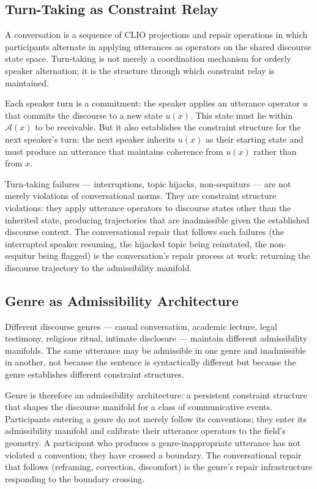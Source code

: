 \documentclass[11pt, a4paper]{article}
\theoremstyle{definition}
\theoremstyle{remark}
\begin{document}
\subsection{Turn-Taking as Constraint Relay}

A conversation is a sequence of CLIO projections and repair operations in
which participants alternate in applying utterances as operators on the shared
discourse state space. Turn-taking is not merely a coordination mechanism for
orderly speaker alternation; it is the structure through which constraint relay
is maintained.

Each speaker turn is a commitment: the speaker applies an utterance operator
$u$ that commits the discourse to a new state $u(x)$. This state must lie
within $\mathcal{A}(x)$ to be receivable. But it also establishes the
constraint structure for the next speaker's turn: the next speaker inherits
$u(x)$ as their starting state and must produce an utterance that maintains
coherence from $u(x)$ rather than from $x$.

Turn-taking failures --- interruptions, topic hijacks, non-sequiturs ---
are not merely violations of conversational norms. They are constraint
structure violations: they apply utterance operators to discourse states
other than the inherited state, producing trajectories that are inadmissible
given the established discourse context. The conversational repair that follows
such failures (the interrupted speaker resuming, the hijacked topic being
reinstated, the non-sequitur being flagged) is the conversation's repair
process at work: returning the discourse trajectory to the admissibility
manifold.

\subsection{Genre as Admissibility Architecture}

Different discourse genres --- casual conversation, academic lecture, legal
testimony, religious ritual, intimate disclosure --- maintain different
admissibility manifolds. The same utterance may be admissible in one genre
and inadmissible in another, not because the sentence is syntactically
different but because the genre establishes different constraint structures.

Genre is therefore an admissibility architecture: a persistent constraint
structure that shapes the discourse manifold for a class of communicative
events. Participants entering a genre do not merely follow its conventions;
they enter its admissibility manifold and calibrate their utterance operators
to the field's geometry. A participant who produces a genre-inappropriate
utterance has not violated a convention; they have crossed a boundary. The
conversational repair that follows (reframing, correction, discomfort) is
the genre's repair infrastructure responding to the boundary crossing.
\end{document}
